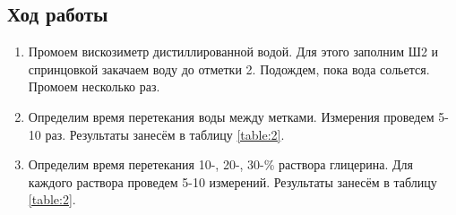 \documentclass[a4paper, 12pt]{article}
\begin{document}
\subsection{Ход работы}
\begin{enumerate}
  \item Промоем вискозиметр дистиллированной водой. Для этого заполним Ш2 и
        спринцовкой закачаем воду до отметки 2. Подождем, пока вода сольется.
        Промоем несколько раз.

  \item Определим время перетекания воды между метками. Измерения проведем 5-10
        раз. Результаты занесём в таблицу \ref{table:2}.

  \item Определим время перетекания 10-, 20-, 30-\% раствора глицерина. Для
        каждого раствора проведем 5-10 измерений. Результаты занесём в таблицу \ref{table:2}.


\end{enumerate}
\end{document}
